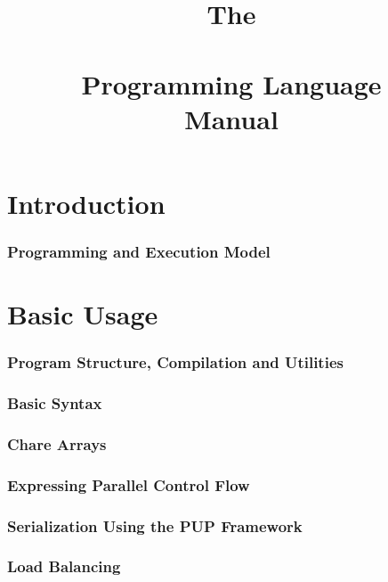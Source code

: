 \documentclass[10pt]{article}
\begin{document}
\title{The\\ \charmpp\\ Programming Language\\ Manual}
\credits{\hspace{0 in}}
\maketitle


\part{Introduction}

\section{Programming and Execution Model}




\part{Basic Usage}

\section{Program Structure, Compilation and Utilities}
  	
  
  

\section{Basic Syntax}
  	
  
  

\section{Chare Arrays}
  

\section{Expressing Parallel Control Flow}
  

\section{Serialization Using the PUP Framework}
  

\section{Load Balancing}
  
\end{document}
